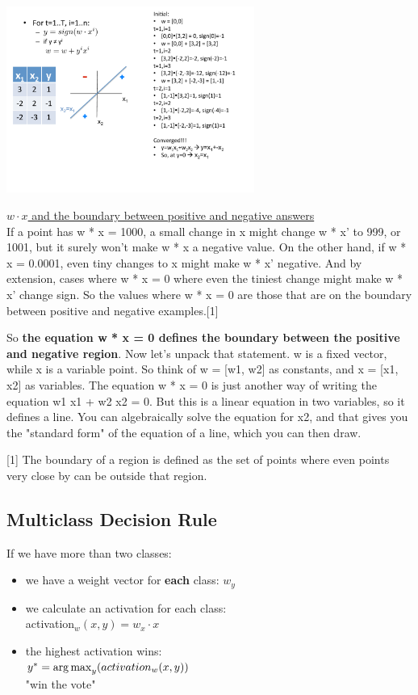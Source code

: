  \includegraphics[width=3.2in]{figures/perceptron_chugging_example.pdf}
 
 \underline{$w \cdot x$ and the boundary between positive and negative answers} \hfill \\
If a point has w * x = 1000, a small change in x might change w * x' to 999, or 1001, but it surely won't make w * x a negative value. On the other hand, if w * x = 0.0001, even tiny changes to x might make w * x' negative. And by extension, cases where w * x = 0 where even the tiniest change might make w * x' change sign. So the values where w * x = 0 are those that are on the boundary between positive and negative examples.[1]

So \textbf{the equation w * x = 0 defines the boundary between the positive and negative region}. Now let's unpack that statement. w is a fixed vector, while x is a variable point. So think of w = [w1, w2] as constants, and x = [x1, x2] as variables. The equation w * x = 0 is just another way of writing the equation w1 x1 + w2 x2 = 0. But this is a linear equation in two variables, so it defines a line. You can algebraically solve the equation for x2, and that gives you the "standard form" of the equation of a line, which you can then draw.

[1] The boundary of a region is defined as the set of points where even points very close by can be outside that region.

 
 \subsection{Multiclass Decision Rule}
 
 If we have more than two classes: 
 \begin{itemize}
 	\item we have a weight vector for \textbf{each} class: $w_y$
	\item we calculate an activation for each class: \hfill \\
		activation$_w(x,y) = w_x \cdot x$
	\item the highest activation wins:  \hfill \\
		$y^* = \operatorname*{arg\,max}_y(activation_w(x,y))$ \hfill \\
		"win the vote" 
 \end{itemize}
 
